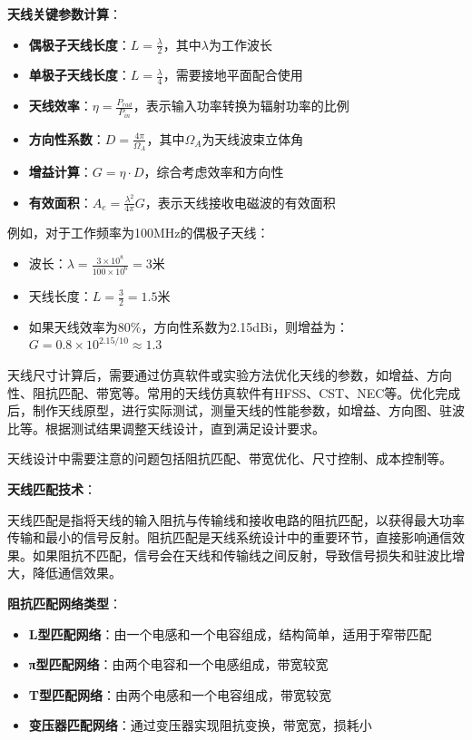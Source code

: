\documentclass[12pt,UTF8]{ctexbook}
\begin{document}
\textbf{天线关键参数计算}：
\begin{itemize}[leftmargin=3.5em]
    \item \textbf{偶极子天线长度}：$L = \frac{\lambda}{2}$，其中$\lambda$为工作波长
    \item \textbf{单极子天线长度}：$L = \frac{\lambda}{4}$，需要接地平面配合使用
    \item \textbf{天线效率}：$\eta = \frac{P_{rad}}{P_{in}}$，表示输入功率转换为辐射功率的比例
    \item \textbf{方向性系数}：$D = \frac{4\pi}{\Omega_A}$，其中$\Omega_A$为天线波束立体角
    \item \textbf{增益计算}：$G = \eta \cdot D$，综合考虑效率和方向性
    \item \textbf{有效面积}：$A_e = \frac{\lambda^2}{4\pi}G$，表示天线接收电磁波的有效面积
\end{itemize}

例如，对于工作频率为100MHz的偶极子天线：
\begin{itemize}[leftmargin=3.5em]
    \item 波长：$\lambda = \frac{3\times10^8}{100\times10^6} = 3$米
    \item 天线长度：$L = \frac{3}{2} = 1.5$米
    \item 如果天线效率为80\%，方向性系数为2.15dBi，则增益为：$G = 0.8 \times 10^{2.15/10} \approx 1.3$
\end{itemize}

天线尺寸计算后，需要通过仿真软件或实验方法优化天线的参数，如增益、方向性、阻抗匹配、带宽等。常用的天线仿真软件有HFSS、CST、NEC等。优化完成后，制作天线原型，进行实际测试，测量天线的性能参数，如增益、方向图、驻波比等。根据测试结果调整天线设计，直到满足设计要求。

天线设计中需要注意的问题包括阻抗匹配、带宽优化、尺寸控制、成本控制等。

\textbf{天线匹配技术}：

天线匹配是指将天线的输入阻抗与传输线和接收电路的阻抗匹配，以获得最大功率传输和最小的信号反射。阻抗匹配是天线系统设计中的重要环节，直接影响通信效果。如果阻抗不匹配，信号会在天线和传输线之间反射，导致信号损失和驻波比增大，降低通信效果。

\textbf{阻抗匹配网络类型}：
\begin{itemize}[leftmargin=3.5em]
    \item \textbf{L型匹配网络}：由一个电感和一个电容组成，结构简单，适用于窄带匹配
    \item \textbf{π型匹配网络}：由两个电容和一个电感组成，带宽较宽
    \item \textbf{T型匹配网络}：由两个电感和一个电容组成，带宽较宽
    \item \textbf{变压器匹配网络}：通过变压器实现阻抗变换，带宽宽，损耗小
\end{itemize}
\end{document}
